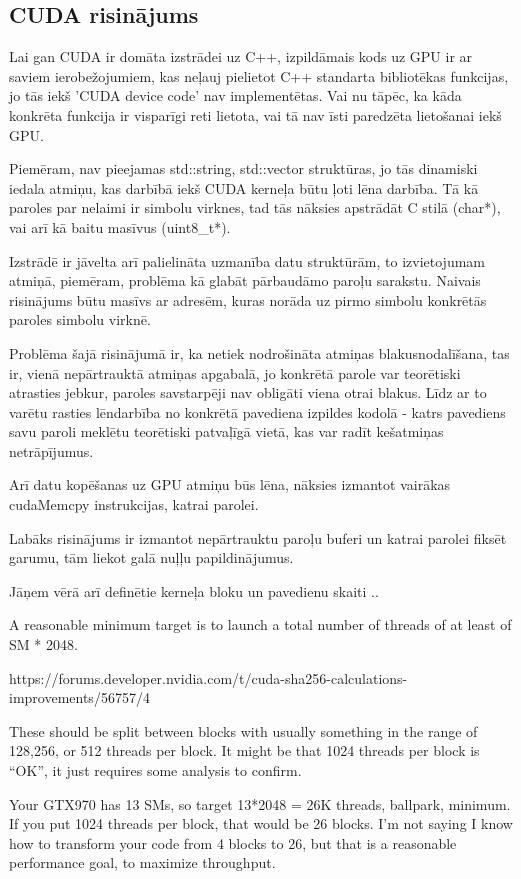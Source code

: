 \documentclass[12pt]{report}%
\theoremstyle{definition}
\begin{document}
\subsection{CUDA risinājums}

Lai gan CUDA ir domāta izstrādei uz C++, izpildāmais kods uz GPU ir ar saviem ierobežojumiem, kas neļauj pielietot C++ standarta bibliotēkas funkcijas, jo tās iekš 'CUDA device code' nav implementētas.
Vai nu tāpēc, ka kāda konkrēta funkcija ir visparīgi reti lietota, vai tā nav īsti paredzēta lietošanai iekš GPU.

Piemēram, nav pieejamas std::string, std::vector struktūras, jo tās dinamiski iedala atmiņu, kas darbībā iekš CUDA kerneļa būtu ļoti lēna darbība.
Tā kā paroles par nelaimi ir simbolu virknes, tad tās nāksies apstrādāt C stilā (char*), vai arī kā baitu masīvus (uint8\_t*).

Izstrādē ir jāvelta arī palielināta uzmanība datu struktūrām, to izvietojumam atmiņā, piemēram,
problēma kā glabāt pārbaudāmo paroļu sarakstu. Naivais risinājums būtu masīvs ar adresēm, kuras norāda uz pirmo simbolu konkrētās paroles simbolu virknē.

Problēma šajā risinājumā ir, ka netiek nodrošināta atmiņas blakusnodalīšana, tas ir, vienā nepārtrauktā atmiņas
apgabalā, jo konkrētā parole var teorētiski atrasties jebkur, paroles savstarpēji nav obligāti viena otrai
blakus. Līdz ar to varētu rasties lēndarbība no konkrētā pavediena izpildes kodolā - katrs pavediens savu
paroli meklētu teorētiski patvaļīgā vietā, kas var radīt kešatmiņas netrāpījumus.


Arī datu kopēšanas uz GPU atmiņu būs lēna, nāksies izmantot vairākas cudaMemcpy instrukcijas, katrai parolei.

Labāks risinājums ir izmantot nepārtrauktu paroļu buferi un katrai parolei fiksēt garumu, tām liekot galā 
nuļļu papildinājumus.


Jāņem vērā arī definētie kerneļa bloku un pavedienu skaiti ..

A reasonable minimum target is to launch a total number of threads of at least of SM * 2048.

https://forums.developer.nvidia.com/t/cuda-sha256-calculations-improvements/56757/4

These should be split between blocks with usually something in the range of 128,256, or 512 threads per block. It might be that 1024 threads per block is “OK”, it just requires some analysis to confirm.

Your GTX970 has 13 SMs, so target 13*2048 = 26K threads, ballpark, minimum. If you put 1024 threads per block, that would be 26 blocks. I’m not saying I know how to transform your code from 4 blocks to 26, but that is a reasonable performance goal, to maximize throughput.
\end{document}
